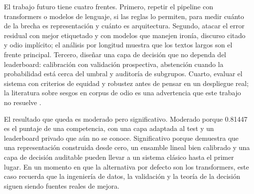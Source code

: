 El trabajo futuro tiene cuatro frentes. Primero, repetir el pipeline con
transformers o modelos de lenguaje, si las reglas lo permiten, para medir
cuánto de la brecha es representación y cuánto es arquitectura. Segundo,
atacar el error residual con mejor etiquetado y con modelos que manejen
ironía, discurso citado y odio implícito; el análisis por longitud muestra
que los textos largos son el frente principal. Tercero, diseñar una capa de
decisión que no dependa del leaderboard: calibración con validación
prospectiva, abstención cuando la probabilidad está cerca del umbral y
auditoría de subgrupos. Cuarto, evaluar el sistema con criterios de equidad
y robustez antes de pensar en un despliegue real; la literatura sobre sesgos
en corpus de odio es una advertencia que este trabajo no resuelve
\cite{davidson2019racial,wiegand2019biased}.

El resultado que queda es moderado pero significativo. Moderado porque
0.81447 es el puntaje de una competencia, con una capa adaptada al test y un
leaderboard privado que aún no se conoce. Significativo porque demuestra que
una representación construida desde cero, un ensamble lineal bien calibrado
y una capa de decisión auditable pueden llevar a un sistema clásico hasta el
primer lugar. En un momento en que la alternativa por defecto son los transformers, este
caso recuerda que la ingeniería de datos, la validación y
la teoría de la decisión siguen siendo fuentes reales de mejora.
